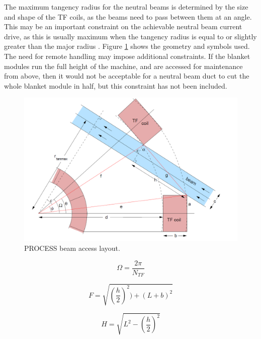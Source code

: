 \documentclass[hidelinks]{article}
\numberwithin{equation}{section}
\begin{document}
    The maximum tangency radius for the neutral beams is determined by the size and 
    shape of the TF coils, as the beams need to pass between them at an angle. This 
    may be an important constraint on the achievable neutral beam current drive, as 
    this is usually maximum when the tangency radius is equal to or slightly greater 
    than the major radius \cite{kovari2014, Surrey2012}. Figure \ref{fig: beam-access} 
    shows the geometry and symbols used.  The need for remote handling may impose 
    additional constraints.  If the blanket modules run the full height of the machine, 
    and are accessed for maintenance from above, then it would not be acceptable for a 
    neutral beam duct to cut the whole blanket module in half, but this constraint has 
    not been included.

    \begin{figure}[!t]
    \centering
    \includegraphics[scale=0.4]{figures/beam_access.PNG}
    \caption{PROCESS beam access layout.} \label{fig: beam-access}
    \end{figure}

    \begin{equation}\label{eq: beam-a-omega}
        \Omega = \frac{2\pi}{N_{TF}}
    \end{equation}

    \begin{equation}\label{eq: beam-a-f}
        F = \sqrt{(\frac{h}{2})^2) + (L + b)^2 }
    \end{equation}

    \begin{equation}\label{eq: beam-a-h}
        H = \sqrt{ L^2 - (\frac{h}{2})^2 }
    \end{equation}
\end{document}
